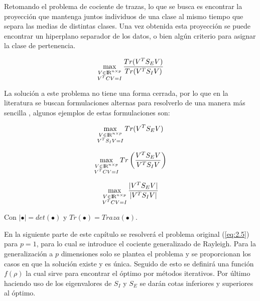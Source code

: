 Retomando el problema de cociente de trazas, lo que se busca es encontrar la proyección que mantenga juntos individuos de una clase al mismo tiempo que separa las medias de distintas clases. Una vez obtenida esta proyección se puede encontrar un hiperplano separador de los datos, o bien algún criterio para asignar la clase de pertenencia. 

\begin{equation}\label{eq:2.5}
	\max_{\substack{V \in {\rm I\!R}^{n \times p} \\ V^TC V = I}} \frac{Tr(V^T S_E V)}{Tr(V^T S_I V)} 	
\end{equation}

 La solución a este problema no tiene una forma cerrada, por lo que en la literatura se buscan formulaciones alternas para resolverlo de una manera más sencilla \cite{wang2007trace} \cite{fukunaga2013introduction}, algunos ejemplos de estas formulaciones son:

\begin{equation}\label{eq:2.6}
	\max_{\substack{V \in {\rm I\!R}^{n \times p} \\ V^T S_I V = I}} Tr(V^T S_E V)
\end{equation}

\begin{equation} \label{eq:2.7}
	\max_{\substack{V \in {\rm I\!R}^{n \times p} \\ V^TC V = I}} Tr\left( \frac{V^T S_E V}{V^T S_I V}\right) 	
\end{equation}

\begin{equation} \label{eq:2.8}
	\max_{\substack{V \in {\rm I\!R}^{n \times p} \\ V^TC V = I}} \frac{|V^T S_E V|}{|V^T S_I V|} 	
\end{equation}

Con $|\bullet| = det(\bullet)$ y $Tr(\bullet) = Traza(\bullet)$.


En la siguiente parte de este capítulo se resolverá el problema original (\ref{eq:2.5}) para $p = 1$, para lo cual se introduce el cociente generalizado de Rayleigh. Para la generalización a $p$ dimensiones solo se plantea el problema y se proporcionan los casos en que la solución existe y es única. Seguido de esto se definirá una función $f(\rho)$ la cual sirve para encontrar el óptimo por métodos iterativos. Por último haciendo uso de los eigenvalores de $S_I$ y $S_E$ se darán cotas inferiores y superiores al óptimo.



